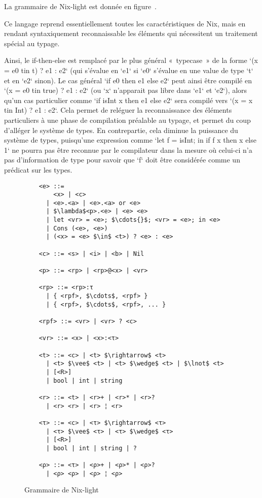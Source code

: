 La grammaire de Nix-light est donnée en figure .

Ce langage reprend essentiellement toutes les caractéristiques de Nix, mais en
rendant syntaxiquement reconnaissable les éléments qui nécessitent un traitement
spécial au typage.

Ainsi, le if-then-else est remplacé par le plus général « typecase » de la
forme `(x = e0 tin t) ? e1 : e2` (qui s'évalue en `e1` si `e0` s'évalue en une
value de type `t` et en `e2` sinon). Le cas général `if e0 then e1 else e2`
peut ainsi être compilé en `(x = e0 tin true) ? e1 : e2` (ou `x` n'apparait pas
libre dans `e1` et `e2`), alors qu'un cas particulier comme
`if isInt x then e1 else e2` sera compilé vers `(x = x tin Int) ? e1 : e2`.
Cela permet de reléguer la reconnaissance des éléments particuliers à une phase
de compilation préalable au typage, et permet du coup d'alléger le système de
types. En contrepartie, cela diminue la puissance du système de types,
puisqu'une expression comme `let f = isInt; in if f x then x else 1` ne pourra
pas être reconnue par le compilateur dans la mesure où celui-ci n'a pas
d'information de type pour savoir que `f` doit être considérée comme un
prédicat sur les types.

\begin{figure}
  \begin{lstlisting}
    <e> ::=
        <x> | <c>
      | <e>.<a> | <e>.<a> or <e>
      | $\lambda$<p>.<e> | <e> <e>
      | let <vr> = <e>; $\cdots{}$; <vr> = <e>; in <e>
      | Cons (<e>, <e>)
      | (<x> = <e> $\in$ <t>) ? <e> : <e>

    <c> ::= <s> | <i> | <b> | Nil

    <p> ::= <rp> | <rp>@<x> | <vr>

    <rp> ::= <rp>:τ
      | { <rpf>, $\cdots$, <rpf> }
      | { <rpf>, $\cdots$, <rpf>, ... }

    <rpf> ::= <vr> | <vr> ? <c>

    <vr> ::= <x> | <x>:<τ>

    <t> ::= <c> | <t> $\rightarrow$ <t>
      | <t> $\vee$ <t> | <t> $\wedge$ <t> | $\lnot$ <t>
      | [<R>]
      | bool | int | string

    <r> ::= <t> | <r>+ | <r>* | <r>?
      | <r> <r> | <r> ¦ <r>

    <τ> ::= <c> | <τ> $\rightarrow$ <τ>
      | <τ> $\vee$ <τ> | <τ> $\wedge$ <τ>
      | [<R>]
      | bool | int | string | ?

    <ρ> ::= <τ> | <ρ>+ | <ρ>* | <ρ>?
      | <ρ> <ρ> | <ρ> ¦ <ρ>
  \end{lstlisting}
  \caption{Grammaire de Nix-light\label{nix-light::grammar}}
\end{figure}
